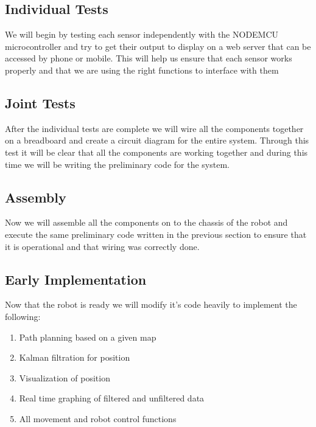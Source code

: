 \documentclass[conference]{IEEEtran}
\begin{document}
    \subsection{Individual Tests}

    We will begin by testing each sensor independently with the NODEMCU microcontroller and
    try to get their output to display on a web server that can be accessed by phone or mobile.
    This will help us ensure that each sensor works properly and that we are using the right
    functions to interface with them

    \subsection{Joint Tests}

    After the individual tests are complete we will wire all the components together on a
    breadboard and create a circuit diagram for the entire system. Through this test it will
    be clear that all the components are working together and during this time we will be writing
    the preliminary code for the system.

    \subsection{Assembly}

    Now we will assemble all the components on to the chassis of the robot and execute the same
    preliminary code written in the previous section to ensure that it is operational and that wiring
    was correctly done.

    \subsection{Early Implementation}

    Now that the robot is ready we will modify it's code heavily to implement the following:

    \begin{enumerate}
        \item Path planning based on a given map
        \item Kalman filtration for position
        \item Visualization of position
        \item Real time graphing of filtered and unfiltered data
        \item All movement and robot control functions
    \end{enumerate}
\end{document}
